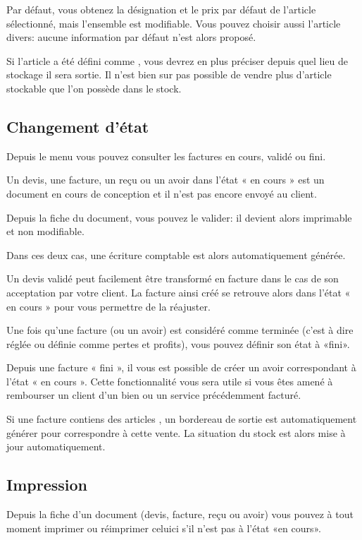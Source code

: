 \documentclass[a4paper,10pt,oneside,french]{sphinxmanual}
\begin{document}
Par défaut, vous obtenez la désignation et le prix par défaut de l’article sélectionné, mais l’ensemble est modifiable. Vous pouvez choisir aussi l’article divers: aucune information par défaut n’est alors proposé.

Si l’article a été défini comme , vous devrez en plus préciser depuis quel lieu de stockage il sera sortie.
Il n’est bien sur pas possible de vendre plus d’article stockable que l’on possède dans le stock.


\subsection{Changement d’état}
\label{\detokenize{invoice/create_bill:changement-d-etat}}
Depuis le menu  vous pouvez consulter les factures en cours, validé ou fini.

Un devis, une facture, un reçu ou un avoir dans l’état « en cours » est un document en cours de conception et il n’est pas encore envoyé au client.

Depuis la fiche du document, vous pouvez le valider: il devient alors imprimable et non modifiable.

Dans ces deux cas, une écriture comptable est alors automatiquement générée.

Un devis validé peut facilement être transformé en facture dans le cas de son acceptation par votre client. La facture ainsi créé se retrouve alors dans l’état « en cours » pour vous permettre de la réajuster.

Une fois qu’une facture (ou un avoir) est considéré comme terminée (c’est à dire réglée ou définie comme pertes et profits), vous pouvez définir son état à «fini».

Depuis une facture « fini », il vous est possible de créer un avoir correspondant à l’état « en cours ». Cette fonctionnalité vous sera utile si vous êtes amené à rembourser un client d’un bien ou un service précédemment facturé.

Si une facture contiens des articles , un bordereau de sortie est automatiquement générer pour correspondre à cette vente.
La situation du stock est alors mise à jour automatiquement.


\subsection{Impression}
\label{\detokenize{invoice/create_bill:impression}}
Depuis la fiche d’un document (devis, facture, reçu ou avoir) vous pouvez à tout moment imprimer ou réimprimer celui\sphinxhyphen{}ci s’il n’est pas à l’état «en cours».
\end{document}
